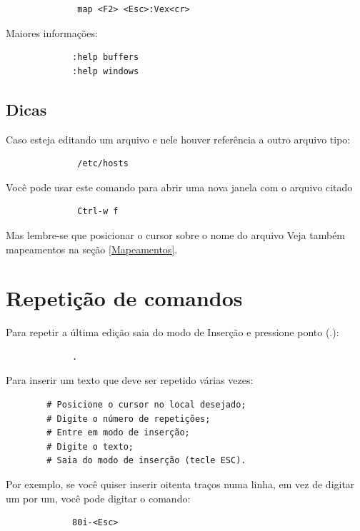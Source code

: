 \documentclass[10pt,a4paper,openany]{book}
\begin{document}
\begin{verbatim}
			  map <F2> <Esc>:Vex<cr>
\end{verbatim}

Maiores informações:

\begin{verbatim}
			 :help buffers
			 :help windows
\end{verbatim}

\section{Dicas}
Caso esteja editando um arquivo e nele houver referência a outro arquivo tipo:

\begin{verbatim}
			  /etc/hosts
\end{verbatim}

Você pode usar este comando para abrir uma nova janela com o arquivo citado

\begin{verbatim}
			  Ctrl-w f
\end{verbatim}

Mas lembre-se que posicionar o cursor sobre o nome do arquivo
Veja também mapeamentos na seção \ref{Mapeamentos}.

\chapter{Repetição de comandos}\label{Repetição de comandos}

Para repetir a última edição saia do modo de Inserção e pressione ponto (.):

\begin{verbatim}
			 .
\end{verbatim}

Para inserir um texto que deve ser repetido várias vezes:

\begin{verbatim}
		# Posicione o cursor no local desejado;
		# Digite o número de repetições;
		# Entre em modo de inserção;
		# Digite o texto;
		# Saia do modo de inserção (tecle ESC).
\end{verbatim}

Por exemplo, se você quiser inserir oitenta traços numa linha, em vez
de digitar um por um, você pode digitar o comando:

\begin{verbatim}
			 80i-<Esc>
\end{verbatim}
\end{document}

